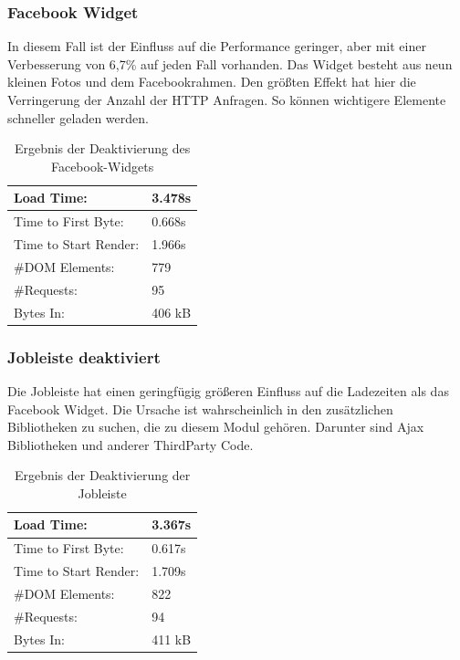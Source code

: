 \subsubsection{Facebook Widget} In diesem Fall ist der Einfluss auf die Performance geringer, aber mit einer Verbesserung von 6,7\% auf jeden Fall vorhanden. Das Widget besteht aus neun kleinen Fotos und dem Facebookrahmen. Den größten Effekt hat hier die Verringerung der Anzahl der HTTP Anfragen. So können wichtigere Elemente schneller geladen werden.

\begin{table}[!ht]
\centering
\caption{Ergebnis der Deaktivierung des Facebook-Widgets}
    \begin{tabular}{ | p{3cm} | p{1.5cm} | }
    \hline
    Load Time: 			& 3.478s 	\\ \hline
    Time to First Byte:		& 0.668s  	\\ \hline
    Time to Start Render:	& 1.966s	\\ \hline
    \#DOM Elements:		& 779 		\\ \hline
    \#Requests:			& 95 		\\ \hline
    Bytes In:			& 406 kB 	\\ \hline
    \hline
    \end{tabular}
\end{table}

\subsubsection{Jobleiste deaktiviert} Die Jobleiste hat einen geringfügig größeren Einfluss auf die Ladezeiten als das Facebook Widget. Die Ursache ist wahrscheinlich in den zusätzlichen Bibliotheken zu suchen, die zu diesem Modul gehören. Darunter sind Ajax Bibliotheken und anderer ThirdParty Code.

\begin{table}[!ht]
\centering
\caption{Ergebnis der Deaktivierung der Jobleiste}
    \begin{tabular}{ | p{3cm} | p{1.5cm} | }
    \hline
    Load Time: 			& 3.367s 	\\ \hline
    Time to First Byte:		& 0.617s  	\\ \hline
    Time to Start Render:	& 1.709s	\\ \hline
    \#DOM Elements:		& 822 		\\ \hline
    \#Requests:			& 94 		\\ \hline
    Bytes In:			& 411 kB 	\\ \hline
    \hline
    \end{tabular}
\end{table}

